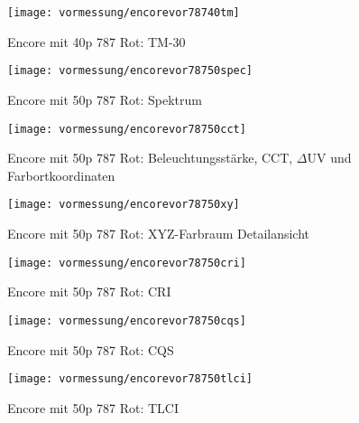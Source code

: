\documentclass[pagesize,paper=A4,fontsize=12pt,utf8,numbers=noenddot,bibliography=totoc,listof=totoc,DIV=11,BCOR=1mm]{scrreprt}
\begin{document}
\begin{figure}[htp]     %
\centering
\texttt{[image: vormessung/encorevor78740tm]} 
\caption {Encore mit 40p 787 Rot: TM-30} 
\end{figure}




\begin{figure}[htp]     %
\centering
\texttt{[image: vormessung/encorevor78750spec]} 
\caption {Encore mit 50p 787 Rot: Spektrum} 
\end{figure}

\begin{figure}[htp]     %
\centering
\texttt{[image: vormessung/encorevor78750cct]} 
\caption {Encore mit 50p 787 Rot: Beleuchtungsstärke, CCT, $\Delta$UV und Farbortkoordinaten} 
\end{figure}

\begin{figure}[htp]     %
\centering
\texttt{[image: vormessung/encorevor78750xy]} 
\caption {Encore mit 50p 787 Rot: XYZ-Farbraum Detailansicht} 
\end{figure}

\begin{figure}[htp]     %
\centering
\texttt{[image: vormessung/encorevor78750cri]} 
\caption {Encore mit 50p 787 Rot: CRI} 
\end{figure}

\begin{figure}[htp]     %
\centering
\texttt{[image: vormessung/encorevor78750cqs]} 
\caption {Encore mit 50p 787 Rot: CQS} 
\end{figure}

\begin{figure}[htp]     %
\centering
\texttt{[image: vormessung/encorevor78750tlci]} 
\caption {Encore mit 50p 787 Rot: TLCI} 
\end{figure}
\end{document}
